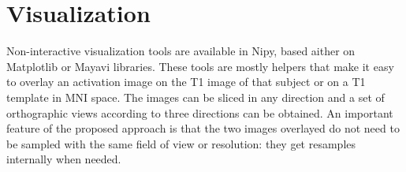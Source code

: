 \documentclass{bioinfo}
\begin{document}
\section{Visualization}
Non-interactive visualization tools are available in Nipy, based
aither on Matplotlib or Mayavi libraries.
%
These tools are mostly helpers that make it easy to overlay an
activation image on the T1 image of that subject or on a T1 template
in MNI space.
%
The images can be sliced in any direction and a set of orthographic
views according to three directions can be obtained.
%
An important feature of the proposed approach is that the two images
overlayed do not need to be sampled with the same field of view or
resolution: they get resamples internally when needed.

\end{document}
